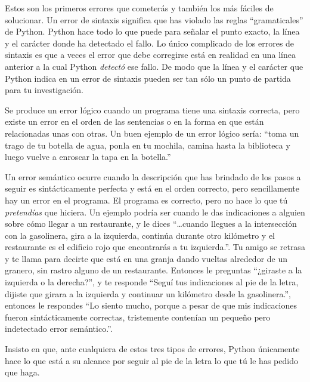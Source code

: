 \begin{description}
\tightlist
\item[Errores de sintaxis (Syntax errors)]
Estos son los primeros errores que cometerás y también los más fáciles
de solucionar. Un error de sintaxis significa que has violado las reglas
``gramaticales'' de Python. Python hace todo lo que puede para señalar
el punto exacto, la línea y el carácter donde ha detectado el fallo. Lo
único complicado de los errores de sintaxis es que a veces el error que
debe corregirse está en realidad en una línea anterior a la cual Python
\emph{detectó} ese fallo. De modo que la línea y el carácter que Python
indica en un error de sintaxis pueden ser tan sólo un punto de partida
para tu investigación.
\item[Errores lógicos]
Se produce un error lógico cuando un programa tiene una sintaxis
correcta, pero existe un error en el orden de las sentencias o en la
forma en que están relacionadas unas con otras. Un buen ejemplo de un
error lógico sería: ``toma un trago de tu botella de agua, ponla en tu
mochila, camina hasta la biblioteca y luego vuelve a enroscar la tapa en
la botella.''
\item[Errores semánticos]
Un error semántico ocurre cuando la descripción que has brindado de los
pasos a seguir es sintácticamente perfecta y está en el orden correcto,
pero sencillamente hay un error en el programa. El programa es correcto,
pero no hace lo que tú \emph{pretendías} que hiciera. Un ejemplo podría
ser cuando le das indicaciones a alguien sobre cómo llegar a un
restaurante, y le dices ``\ldots cuando llegues a la intersección con la
gasolinera, gira a la izquierda, continúa durante otro kilómetro y el
restaurante es el edificio rojo que encontrarás a tu izquierda.''. Tu
amigo se retrasa y te llama para decirte que está en una granja dando
vueltas alrededor de un granero, sin rastro alguno de un restaurante.
Entonces le preguntas ``¿giraste a la izquierda o la derecha?'', y te
responde ``Seguí tus indicaciones al pie de la letra, dijiste que girara
a la izquierda y continuar un kilómetro desde la gasolinera.'', entonces
le respondes ``Lo siento mucho, porque a pesar de que mis indicaciones
fueron sintácticamente correctas, tristemente contenían un pequeño pero
indetectado error semántico.''.
\end{description}

Insisto en que, ante cualquiera de estos tres tipos de errores, Python
únicamente hace lo que está a su alcance por seguir al pie de la letra
lo que tú le has pedido que haga.

